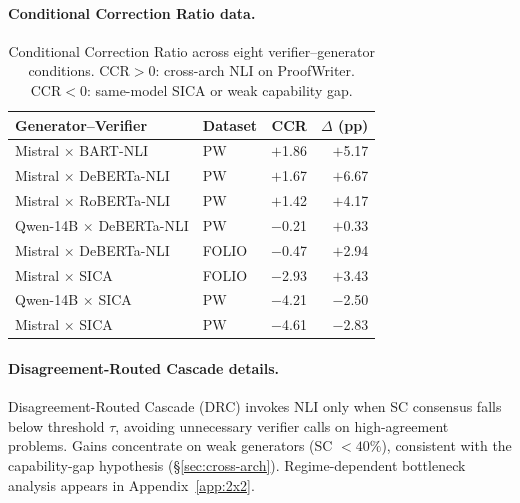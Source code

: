 \paragraph{Conditional Correction Ratio data.}
\label{app:cil-data}

\begin{table}[h]
\centering
\small
\setlength{\tabcolsep}{3pt}
\caption{Conditional Correction Ratio across eight verifier--generator conditions. $\text{CCR} > 0$: cross-arch NLI on ProofWriter. $\text{CCR} < 0$: same-model SICA or weak capability gap.}
\label{tab:cil_main}
\begin{tabular}{@{}llrr@{}}
\toprule
Generator--Verifier & Dataset & CCR & $\Delta$ (pp) \\
\midrule
Mistral $\times$ BART-NLI & PW & $+$1.86 & $+$5.17 \\
Mistral $\times$ DeBERTa-NLI & PW & $+$1.67 & $+$6.67 \\
Mistral $\times$ RoBERTa-NLI & PW & $+$1.42 & $+$4.17 \\
\addlinespace
Qwen-14B $\times$ DeBERTa-NLI & PW & $-$0.21 & $+$0.33 \\
Mistral $\times$ DeBERTa-NLI & FOLIO & $-$0.47 & $+$2.94 \\
\addlinespace
Mistral $\times$ SICA & FOLIO & $-$2.93 & $+$3.43 \\
Qwen-14B $\times$ SICA & PW & $-$4.21 & $-$2.50 \\
Mistral $\times$ SICA & PW & $-$4.61 & $-$2.83 \\
\bottomrule
\end{tabular}
\end{table}

\paragraph{Disagreement-Routed Cascade details.}
\label{app:drc}
Disagreement-Routed Cascade (DRC) invokes NLI only when SC consensus falls below threshold $\tau$, avoiding unnecessary verifier calls on high-agreement problems. Gains concentrate on weak generators (SC $< 40\%$), consistent with the capability-gap hypothesis (\S\ref{sec:cross-arch}). Regime-dependent bottleneck analysis appears in Appendix~\ref{app:2x2}.

